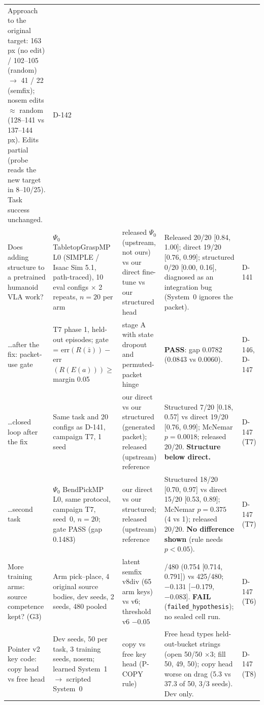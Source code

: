 \documentclass[10pt,twocolumn]{article}
\begin{document}
\begin{table}[t]
\begin{tabularx}{\textwidth}{@{}>{\raggedright\arraybackslash}p{2.75cm}>{\raggedright\arraybackslash}p{3.9cm}>{\raggedright\arraybackslash}p{3.0cm}>{\raggedright\arraybackslash}X>{\raggedright\arraybackslash}p{1.25cm}@{}}
Approach to the original target: 163\,px (no edit) / 102--105 (random) $\to$ 41 / 22 (semfix); nosem edits $\approx$ random (128--141 vs 137--144\,px). Edits partial (probe reads the new target in 8--10/25). Task success unchanged. &
D-142 \\
\addlinespace
Does adding structure to a pretrained humanoid VLA work? &
$\Psi_0$ TabletopGraspMP L0 (SIMPLE / Isaac Sim 5.1, path-traced), 10 eval configs $\times$ 2 repeats, $n{=}20$ per arm &
released $\Psi_0$ (upstream, not ours) vs our direct fine-tune vs our structured head &
Released 20/20 [0.84, 1.00]; direct 19/20 [0.76, 0.99]; structured 0/20 [0.00, 0.16], diagnosed as an integration bug (System~0 ignores the packet). &
D-141 \\
\addlinespace
\ldots after the fix: packet-use gate &
T7 phase 1, held-out episodes; gate = err$(R(\bar z))-$err$(R(E(a)))\ge$ margin 0.05 &
stage A with state dropout and permuted-packet hinge &
\textbf{PASS}: gap 0.0782 (0.0843 vs 0.0060). &
D-146, D-147 \\
\addlinespace
\ldots closed loop after the fix &
Same task and 20 configs as D-141, campaign T7, 1 seed &
our direct vs our structured (generated packet); released (upstream) reference &
Structured 7/20 [0.18, 0.57] vs direct 19/20 [0.76, 0.99]; McNemar $p{=}0.0018$; released 20/20. \textbf{Structure below direct.} &
D-147 (T7) \\
\addlinespace
\ldots second task &
$\Psi_0$ BendPickMP L0, same protocol, campaign T7, seed~0, $n{=}20$; gate PASS (gap 0.1483) &
our direct vs our structured; released (upstream) reference &
Structured 18/20 [0.70, 0.97] vs direct 15/20 [0.53, 0.89]; McNemar $p{=}0.375$ (4 vs 1); released 20/20. \textbf{No difference shown} (rule needs $p<0.05$). &
D-147 (T7) \\
\addlinespace
More training arms: source competence kept? (G3) &
Arm pick--place, 4 original source bodies, dev seeds, 2 seeds, 480 pooled &
latent semfix v8div (65 arm keys) vs v6; threshold v6 $-0.05$ &
362/480 (0.754 [0.714, 0.791]) vs 425/480; $-0.131$ [$-0.179$, $-0.083$]. \textbf{FAIL} (\texttt{failed\_hypothesis}); no sealed cell run. &
D-147 (T6) \\
\addlinespace
Pointer v2 key code: copy head vs free head &
Dev seeds, 50 per task, 3 training seeds, nosem; learned System~1 $\to$ scripted System~0 &
copy vs free key head (P-COPY rule) &
Free head types held-out-bucket strings (open 50/50 $\times3$; fill 50, 49, 50); copy head worse on drag (5.3 vs 37.3 of 50, 3/3 seeds). Dev only. &
D-147 (T8) \\
\bottomrule
\end{tabularx}
\end{table}
\end{document}
